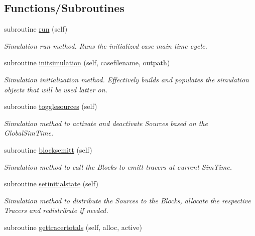 \subsection*{Functions/\+Subroutines}
\begin{DoxyCompactItemize}
\item 
subroutine \mbox{\hyperlink{namespacesimulation__mod_a73bd78c4ac76c51f1e10f5847c25c4df}{run}} (self)
\begin{DoxyCompactList}\small\item\em Simulation run method. Runs the initialized case main time cycle. \end{DoxyCompactList}\item 
subroutine \mbox{\hyperlink{namespacesimulation__mod_aedbba2bb458cbcd7eb93938a5f7b5940}{initsimulation}} (self, casefilename, outpath)
\begin{DoxyCompactList}\small\item\em Simulation initialization method. Effectively builds and populates the simulation objects that will be used latter on. \end{DoxyCompactList}\item 
subroutine \mbox{\hyperlink{namespacesimulation__mod_a87a5141e4516b9610a6e4f0d2ff2d719}{togglesources}} (self)
\begin{DoxyCompactList}\small\item\em Simulation method to activate and deactivate Sources based on the GlobalSim\+Time. \end{DoxyCompactList}\item 
subroutine \mbox{\hyperlink{namespacesimulation__mod_a13aa0745f4601e3f418143dab2f18276}{blocksemitt}} (self)
\begin{DoxyCompactList}\small\item\em Simulation method to call the Blocks to emitt tracers at current Sim\+Time. \end{DoxyCompactList}\item 
subroutine \mbox{\hyperlink{namespacesimulation__mod_a447c6d709de6aa360a65d39d660e627b}{setinitialstate}} (self)
\begin{DoxyCompactList}\small\item\em Simulation method to distribute the Sources to the Blocks, allocate the respective Tracers and redistribute if needed. \end{DoxyCompactList}\item 
subroutine \mbox{\hyperlink{namespacesimulation__mod_ab40f39c4bf37da066101f93b67ad9b26}{gettracertotals}} (self, alloc, active)

\end{DoxyCompactItemize}
